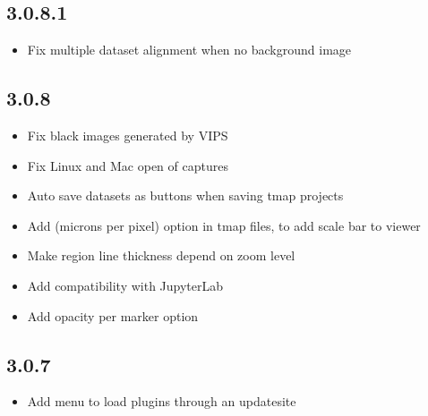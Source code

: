\documentclass[letterpaper,10pt,english,openany,oneside]{sphinxmanual}
\begin{document}
\subsection{3.0.8.1}
\label{\detokenize{docs/intro/versions:id10}}\begin{itemize}
\item {} 
\sphinxAtStartPar
Fix multiple dataset alignment when no background image

\end{itemize}


\subsection{3.0.8}
\label{\detokenize{docs/intro/versions:id11}}\begin{itemize}
\item {} 
\sphinxAtStartPar
Fix black images generated by VIPS

\item {} 
\sphinxAtStartPar
Fix Linux and Mac open of captures

\item {} 
\sphinxAtStartPar
Auto save datasets as buttons when saving tmap projects

\item {} 
\sphinxAtStartPar
Add  (microns per pixel) option in tmap files, to add scale bar to viewer

\item {} 
\sphinxAtStartPar
Make region line thickness depend on zoom level

\item {} 
\sphinxAtStartPar
Add compatibility with JupyterLab

\item {} 
\sphinxAtStartPar
Add opacity per marker option

\end{itemize}


\subsection{3.0.7}
\label{\detokenize{docs/intro/versions:id12}}\begin{itemize}
\item {} 
\sphinxAtStartPar
Add menu to load plugins through an update\sphinxhyphen{}site

\end{itemize}
\end{document}
